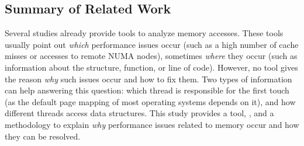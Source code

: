 \subsection{Summary of Related Work}

Several studies already provide tools to analyze memory accesses.
These tools usually point out \emph{which} performance issues occur (such as a high number of cache misses or accesses to remote NUMA nodes), sometimes \emph{where} they occur (such as information about the structure, function, or line of code).
However, no tool gives the reason \emph{why} such issues occur and how to fix them.
Two types of information can help answering this question: which thread is responsible for the first touch (as the default page mapping of most operating systems depends on it), and how different threads access data structures.
This study provides a tool, \TABARNAC, and a methodology to explain \emph{why} performance issues related to memory occur and how they can be resolved.




